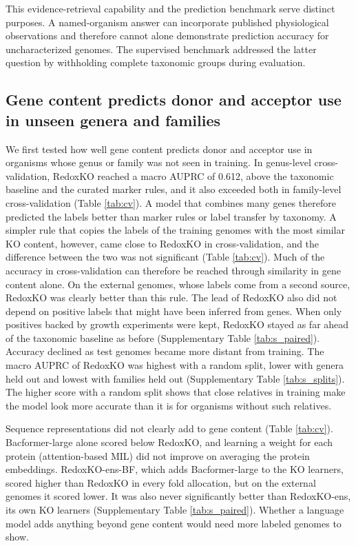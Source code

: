 \documentclass[10pt,a4paper,onecolumn]{article}
\begin{document}
This evidence-retrieval capability and the prediction benchmark serve
distinct purposes. A named-organism answer can incorporate published
physiological observations and therefore cannot alone demonstrate
prediction accuracy for uncharacterized genomes. The supervised
benchmark addressed the latter question by withholding complete
taxonomic groups during evaluation.

\subsection{Gene content predicts donor and acceptor use in unseen
genera and
families}\label{gene-content-predicts-donor-and-acceptor-use-in-unseen-genera-and-families}

We first tested how well gene content predicts donor and acceptor use in
organisms whose genus or family was not seen in training. In genus-level
cross-validation, RedoxKO reached a macro AUPRC of 0.612, above the
taxonomic baseline and the curated marker rules, and it also exceeded
both in family-level cross-validation (Table \ref{tab:cv}). A model that
combines many genes therefore predicted the labels better than marker
rules or label transfer by taxonomy. A simpler rule that copies the
labels of the training genomes with the most similar KO content,
however, came close to RedoxKO in cross-validation, and the difference
between the two was not significant (Table \ref{tab:cv}). Much of the
accuracy in cross-validation can therefore be reached through similarity
in gene content alone. On the external genomes, whose labels come from a
second source, RedoxKO was clearly better than this rule. The lead of
RedoxKO also did not depend on positive labels that might have been
inferred from genes. When only positives backed by growth experiments
were kept, RedoxKO stayed as far ahead of the taxonomic baseline as
before (Supplementary Table \ref{tab:s_paired}). Accuracy declined as
test genomes became more distant from training. The macro AUPRC of
RedoxKO was highest with a random split, lower with genera held out and
lowest with families held out (Supplementary Table \ref{tab:s_splits}).
The higher score with a random split shows that close relatives in
training make the model look more accurate than it is for organisms
without such relatives.

Sequence representations did not clearly add to gene content (Table
\ref{tab:cv}). Bacformer-large alone scored below RedoxKO, and learning
a weight for each protein (attention-based MIL) did not improve on
averaging the protein embeddings. RedoxKO-ens-BF, which adds
Bacformer-large to the KO learners, scored higher than RedoxKO in every
fold allocation, but on the external genomes it scored lower. It was
also never significantly better than RedoxKO-ens, its own KO learners
(Supplementary Table \ref{tab:s_paired}). Whether a language model adds
anything beyond gene content would need more labeled genomes to show.
\end{document}
